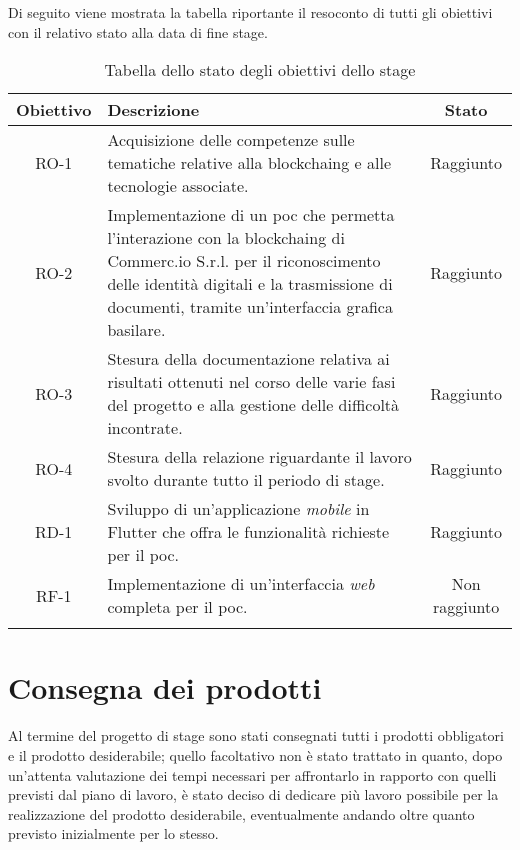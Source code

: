 Di seguito viene mostrata la tabella riportante il resoconto di tutti gli obiettivi con il relativo stato alla data di fine stage.

\begin{longtable}{|c|p{7.8cm}|c|}
	\hline
	\rowcolor{gray}
	\textbf{Obiettivo} & \textbf{Descrizione} & \textbf{Stato} \\\hline
	RO-1 & Acquisizione delle competenze sulle tematiche relative alla \gls{blockchaing} e alle tecnologie associate. & Raggiunto \\\hline
	RO-2 & Implementazione di un \gls{poc} che permetta l'interazione con la \gls{blockchaing} di Commerc.io S.r.l. per il riconoscimento delle identità digitali e la trasmissione di documenti, tramite un'interfaccia grafica basilare. & Raggiunto \\\hline
	RO-3 & Stesura della documentazione relativa ai risultati ottenuti nel corso delle varie fasi del progetto e alla gestione delle difficoltà incontrate. & Raggiunto \\\hline
	RO-4 & Stesura della relazione riguardante il lavoro svolto durante tutto il periodo di stage. & Raggiunto \\\hline
	RD-1 & Sviluppo di un'applicazione \textit{mobile} in Flutter che offra le funzionalità richieste per il \gls{poc}. & Raggiunto \\\hline
	RF-1 & Implementazione di un'interfaccia \textit{web} completa per il \gls{poc}. & Non raggiunto \\\hline
	
	\caption{Tabella dello stato degli obiettivi dello stage}
	\label{tab:raggiungimento-obiettivi}
\end{longtable}

\section{Consegna dei prodotti}

Al termine del progetto di stage sono stati consegnati tutti i prodotti obbligatori e il prodotto desiderabile; quello facoltativo non è stato trattato in quanto, dopo un'attenta valutazione dei tempi necessari per affrontarlo in rapporto con quelli previsti dal piano di lavoro, è stato deciso di dedicare più lavoro possibile per la realizzazione del prodotto desiderabile, eventualmente andando oltre quanto previsto inizialmente per lo stesso.

